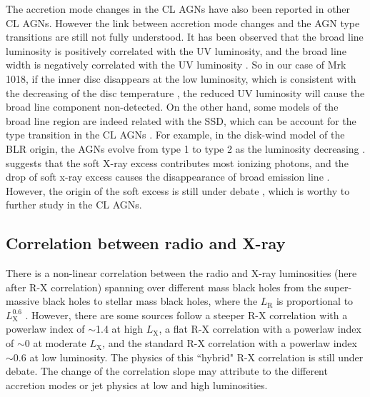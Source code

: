 \documentclass[twocolumn]{aastex63}
\begin{document}
The accretion mode changes in the CL AGNs have also been reported in other CL AGNs\citep{Liu2019,Liu2020,Ai2020}. However the link between accretion mode changes and the AGN type transitions are still not fully understood. It has been observed that the broad line luminosity is positively correlated with the UV luminosity, and the broad line width is negatively correlated with the UV luminosity \citep{2019ApJ.885.44D}. So in our case of Mrk 1018, if the inner disc disappears at the low luminosity, which is consistent with the decreasing of the disc temperature \citep[see also ][]{Noda2018}, the reduced UV luminosity will cause the broad line component non-detected. On the other hand, some models of the broad line region are indeed related with the SSD, which can be account for the type transition in the CL AGNs \citep[see a recent review in ][]{Czerny2019}. For example, in the disk-wind model of the BLR origin, the AGNs evolve from type 1 to type 2 as the luminosity decreasing \citet{2014MNRAS.438.3340E}. \citet{2018MNRAS.480.3898N} suggests that the soft X-ray excess contributes most ionizing photons, and the drop of soft x-ray excess causes the disappearance of broad emission line \citep[see also in ][]{Liu2020}. However, the origin of the soft excess is still under debate \citep[e.g.][]{Petrucci2018}, which is worthy to further study in the CL AGNs. 

\subsection{Correlation between radio and X-ray}
There is a non-linear correlation between the radio and X-ray luminosities (here after R-X correlation) spanning over different mass black holes from the super-massive black holes to stellar mass black holes, where the $L_\mathrm{R}$ is proportional to $L_\mathrm{X}^{0.6}$ \citep{Merloni2003,Falcke2004}. However, there are some sources follow a steeper R-X correlation with a powerlaw index of $\sim$1.4 at high $L_\mathrm{X}$, a flat R-X correlation with a powerlaw index of  $\sim$0 at moderate $L_\mathrm{X}$, and the standard R-X correlation with a powerlaw index $\sim$0.6 \cite[e.g. ][]{Coriat2011,Xie2016} at low luminosity. The physics of this ``hybrid" R-X correlation is still under debate. The change of the correlation slope may attribute to the different accretion modes or jet physics at low and high luminosities\citep{2016MNRAS.456.4377X,2018MNRAS.481.4513I,2018MNRAS.473.4122E}. 
\end{document}

